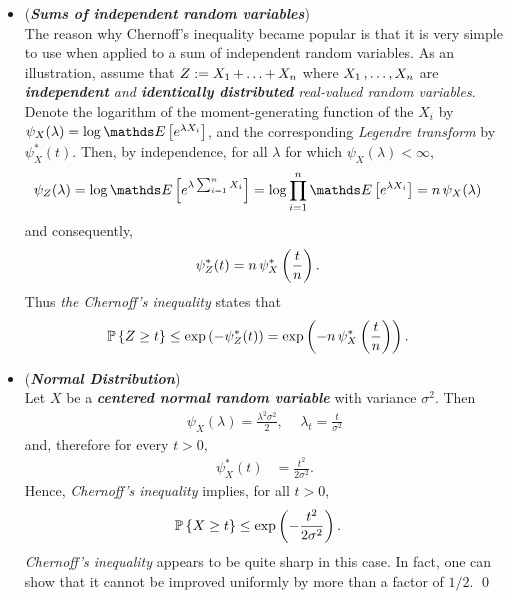 \documentclass[11pt]{article}
\begin{document}
\begin{itemize}
\item \begin{remark}(\emph{\textbf{Sums of independent random variables}})\\
The reason why Chernoff's inequality became popular is that it is very simple to use when applied to a sum of independent random
variables. As an illustration, assume that $Z := X_1 \,{+}\ldots{+}\, X_n$ where $X_1 \,{,}\ldots{,}\, X_n$ are \emph{\textbf{independent} and \textbf{identically distributed} real-valued random variables}.  Denote the logarithm of the moment-generating function of the $X_i$ by $\psi_X(\lambda) = \log \E{}{e^{\lambda X_i}}$, and the corresponding \emph{Legendre transform} by $\psi_X^{*}(t)$. Then, by independence, for all $\lambda$ for which $\psi_X(\lambda) < \infty$,
\begin{align*}
\psi_Z(\lambda) &= \log \E{}{e^{\lambda\sum_{i=1}^{n}X_i}} = \log \prod_{i=1}^{n}\E{}{e^{\lambda X_i}}  = n\, \psi_{X}(\lambda)
\end{align*} and consequently,
\begin{align*}
\psi_Z^{*}(t) &= n\,\psi_{X}^{*}\left(\frac{t}{n}\right).
\end{align*} Thus \emph{the Chernoff's inequality} states that 
\begin{align*}
{\mathbb P}\left\{Z \ge t\right\} &\le \exp\left(-\psi^{*}_{Z}(t)\right) = \exp\left(-n\,\psi_{X}^{*}\left(\frac{t}{n}\right)\right).
\end{align*}
\end{remark}

\item \begin{example} (\emph{\textbf{Normal Distribution}})\\
Let $X$ be a \emph{\textbf{centered normal random variable}} with variance $\sigma^2$. Then
\begin{align*}
\psi_X(\lambda) = \frac{\lambda^2 \sigma^2}{2},\, \quad \lambda_t = \frac{t}{\sigma^2}
\end{align*} and, therefore for every $t > 0$, 
\begin{align*}
\psi_{X}^{*}(t) &= \frac{t^2}{2\sigma^2}.
\end{align*} Hence, \emph{Chernoff's inequality} implies, for all $t > 0$,
\begin{align*}
{\mathbb P}\left\{X \ge t\right\} &\le \exp\left(-\frac{t^2}{2\sigma^2}\right).
\end{align*} \emph{Chernoff's inequality} appears to be quite sharp in this case. In fact, one can show that it cannot be improved uniformly by more than a factor of $1/2$. \qed
\end{example}



\end{itemize}
\end{document}
